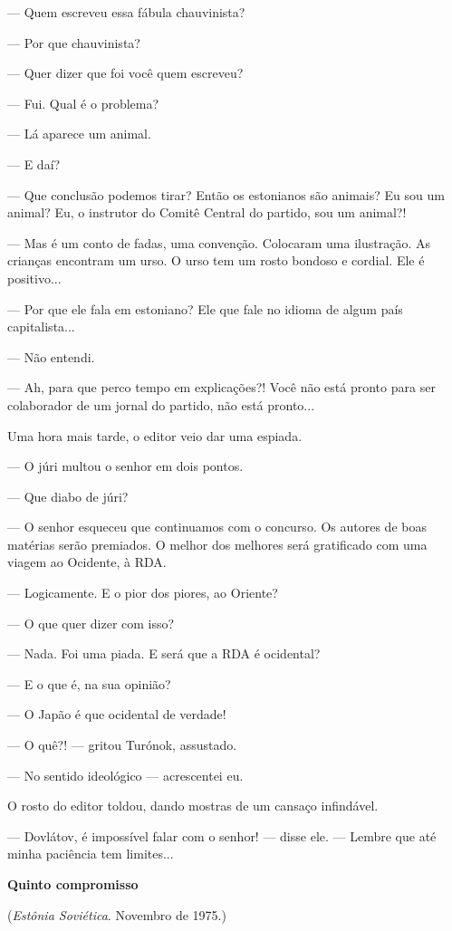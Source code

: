 --- Quem escreveu essa fábula chauvinista?

--- Por que chauvinista?

--- Quer dizer que foi você quem escreveu?

--- Fui. Qual é o problema?

--- Lá aparece um animal.

--- E daí?

--- Que conclusão podemos tirar? Então os estonianos são animais? Eu sou
um animal? Eu, o instrutor do Comitê Central do partido, sou um animal?!

--- Mas é um conto de fadas, uma convenção. Colocaram uma ilustração. As
crianças encontram um urso. O urso tem um rosto bondoso e cordial. Ele é
positivo...

--- Por que ele fala em estoniano? Ele que fale no idioma de algum país
capitalista...

--- Não entendi.

--- Ah, para que perco tempo em explicações?! Você não está pronto para
ser colaborador de um jornal do partido, não está pronto...

Uma hora mais tarde, o editor veio dar uma espiada.

--- O júri multou o senhor em dois pontos.

--- Que diabo de júri?

--- O senhor esqueceu que continuamos com o concurso. Os autores de boas
matérias serão premiados. O melhor dos melhores será gratificado com uma
viagem ao Ocidente, à RDA.

--- Logicamente. E o pior dos piores, ao Oriente?

--- O que quer dizer com isso?

--- Nada. Foi uma piada. E será que a RDA é ocidental?

--- E o que é, na sua opinião?

--- O Japão é que ocidental de verdade!

--- O quê?! --- gritou Turónok, assustado.

--- No sentido ideológico --- acrescentei eu.

O rosto do editor toldou, dando mostras de um cansaço infindável.

--- Dovlátov, é impossível falar com o senhor! --- disse ele. --- Lembre
que até minha paciência tem limites...

\textbf{Quinto compromisso}

(\emph{Estônia Soviética}. Novembro de 1975.)


